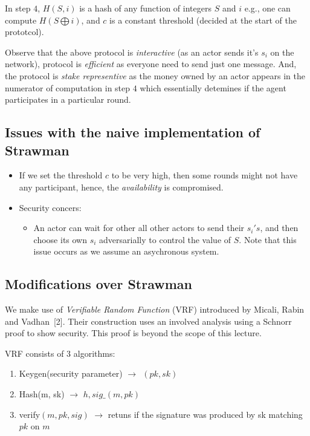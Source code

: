 \documentclass[twoside]{article}
\renewcommand{\cite}[1]{[#1]}
\begin{document}
In step $4$, $H(S, i)$ is a hash of any function of integers $S$ and $i$ e.g., one can compute $H(S \bigoplus i)$, and $c$ is a constant threshold (decided at the start of the prototcol).

Observe that the above protocol is \emph{interactive} (as an actor sends it's $s_{i}$ on the network), protocol is \emph{efficient} as everyone need to send just one message.
And, the protocol is \emph{stake representive} as the money owned by an actor appears in the numerator of computation in step $4$ which essentially detemines
if the agent participates in a particular round.

\subsection{Issues with the naive implementation of Strawman}

\begin{itemize}
    \item If we set the threshold $c$ to be very high, then some rounds might not have any participant, hence, the \emph{availability} is compromised.
    \item Security concers: 
    \begin{itemize}
        \item An actor can wait for other all other actors to send their $s_{i}'s$, and then choose its own $s_{i}$ adversarially to control the value of $S$. Note that this issue occurs as we assume an asychronous system.
    \end{itemize}
\end{itemize}

\subsection{Modifications over Strawman}

We make use of \emph{Verifiable Random Function} (VRF) introduced by Micali, Rabin and Vadhan~\cite{2}.
Their construction uses an involved analysis using a Schnorr proof to show security. This proof is beyond the scope of this lecture.

VRF consists of 3 algorithms:
\begin{enumerate}
	\item Keygen(security parameter) $\rightarrow{} ~~ (pk,sk)$
	\item Hash(m, sk) $\rightarrow$ $h,sig\_(m,pk)$
	\item verify$(m, pk, sig)$ $\rightarrow$ retuns if the signature was produced by sk matching $pk$ on $m$
\end{enumerate}
\end{document}
